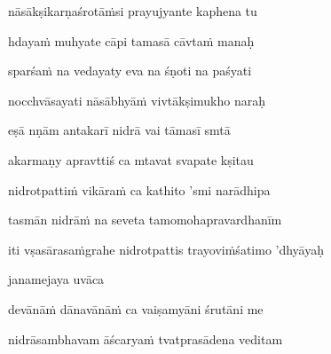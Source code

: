 nāsākṣikarṇaśrotā\.msi prayujyante kaphena tu \veg\dontdisplaylinenum

hdaya\.m muhyate cāpi tamasā cāvta\.m manaḥ\thinspace{\dandab} \dontdisplaylinenum

sparśa\.m na vedayaty eva na śṇoti na paśyati \veg\dontdisplaylinenum

nocchvāsayati nāsābhyā\.m vivtākṣimukho naraḥ\thinspace{\dandab} \dontdisplaylinenum

eṣā nṇām antakarī nidrā vai tāmasī smtā \veg\dontdisplaylinenum

akarmaṇy apravttiś ca mtavat svapate kṣitau\thinspace{\dandab} \dontdisplaylinenum

nidrotpatti\.m vikāra\.m ca kathito 'smi narādhipa \danda\dontdisplaylinenum

tasmān nidrā\.m na seveta tamomohapravardhanīm \veg\dontdisplaylinenum


\jump
\begin{center}
\ketdanda iti vṣasārasa\.mgrahe nidrotpattis trayovi\.mśatimo 'dhyāyaḥ\ketdanda
\end{center}
\dontdisplaylinenum\vers 
\bekveg\szamveg\vfill\phpspagebreak\szam\bek{}
\thispagestyle{empty}



\jump\jump
\vers

janamejaya uvāca~{\dandab}\dontdisplaylinenum 

devānā\.m dānavānā\.m ca vaiṣamyāni śrutāni me\thinspace{\danda} \dontdisplaylinenum

nidrāsambhavam āścarya\.m tvatprasādena veditam \veg\dontdisplaylinenum

